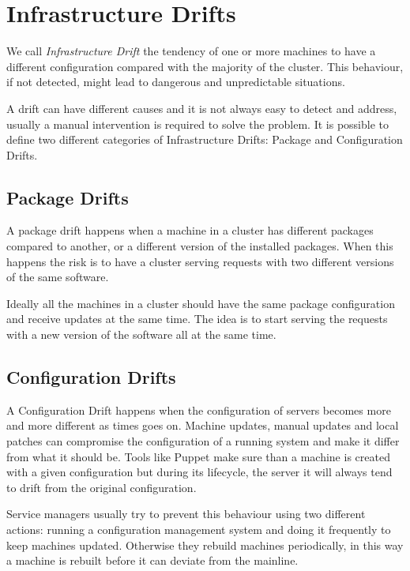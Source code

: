 \section{Infrastructure Drifts}

We call \textit{Infrastructure Drift} the tendency of one or more machines
to have a different configuration compared with the majority of the
cluster. This behaviour, if not detected, might lead to dangerous and
unpredictable situations.

A drift can have different causes and it is not always easy to detect and
address, usually a manual intervention is required to solve the problem.
It is possible to define two different categories of Infrastructure
Drifts: Package and Configuration Drifts.

\subsection{Package Drifts}

A package drift happens when a machine in a cluster has different packages
compared to another, or a different version of the installed packages.
When this happens the risk is to have a cluster serving requests with two
different versions of the same software.

Ideally all the machines in a cluster should have the same package
configuration and receive updates at the same time. The idea is to start
serving the requests with a new version of the software all at the same
time. 

\subsection{Configuration Drifts}

A Configuration Drift happens when the configuration of servers becomes
more and more different as times goes on. Machine updates, manual updates
and local patches can compromise the configuration of a running system and
make it differ from what it should be. Tools like Puppet make sure than
a machine is created with a given configuration but during its lifecycle,
the server it will always tend to drift from the original configuration.

Service managers usually try to prevent this behaviour using two different
actions: running a configuration management system and doing it frequently
to keep machines updated. Otherwise they rebuild machines periodically, in
this way a machine is rebuilt before it can deviate from the mainline.
